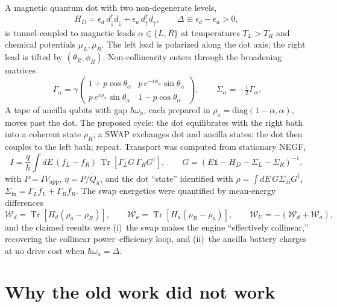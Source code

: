 \documentclass[11pt,a4paper]{article}
\newcommand{\up}{\uparrow}
\newcommand{\dn}{\downarrow}
\newcommand{\Tr}{\operatorname{Tr}}
\begin{document}
A magnetic quantum dot with two non-degenerate levels,
\begin{equation}
H_D=\epsilon_d\, d^\dagger_\dn d_\dn+\epsilon_u\, d^\dagger_\up d_\up,
\qquad \Delta\equiv\epsilon_d-\epsilon_u>0,
\end{equation}
is tunnel-coupled to magnetic leads $\alpha\in\{L,R\}$ at temperatures $T_L>T_R$ and chemical potentials $\mu_L,\mu_R$. The left lead is polarized along the dot axis; the right lead is tilted by $(\theta_R,\phi_R)$. Non-collinearity enters through the broadening matrices
\begin{equation}\label{eq:gamma}
\Gamma_\alpha=\gamma
\begin{pmatrix}
1+p\cos\theta_\alpha & p\,e^{-i\phi_\alpha}\sin\theta_\alpha\\
p\,e^{i\phi_\alpha}\sin\theta_\alpha & 1-p\cos\theta_\alpha
\end{pmatrix},
\qquad \Sigma_\alpha=-\tfrac{i}{2}\Gamma_\alpha .
\end{equation}
A tape of ancilla qubits with gap $\hbar\omega_a$, each prepared in $\rho_a=\mathrm{diag}(1-\alpha,\alpha)$, moves past the dot. The proposed cycle: the dot equilibrates with the right bath into a coherent state $\rho_R$; a SWAP exchanges dot and ancilla states; the dot then couples to the left bath; repeat. Transport was computed from stationary NEGF,
\begin{equation}\label{eq:landauer}
I=\frac{q}{h}\!\int\! dE\,(f_L-f_R)\,\Tr\!\left[\Gamma_L G\, \Gamma_R G^\dagger\right],
\qquad
G=(E\mathbb{1}-H_D-\Sigma_L-\Sigma_R)^{-1},
\end{equation}
with $P=IV_{\mathrm{app}}$, $\eta=P/\dot Q_h$, and the dot ``state'' identified with $\rho=\int dE\,G\Sigma_{\mathrm{in}}G^\dagger$, $\Sigma_{\mathrm{in}}=\Gamma_Lf_L+\Gamma_Rf_R$. The swap energetics were quantified by mean-energy differences
\begin{equation}\label{eq:Wd}
\mathcal{W}_d=\Tr\!\left[H_d(\rho_a-\rho_R)\right],\qquad
\mathcal{W}_a=\Tr\!\left[H_a(\rho_R-\rho_a)\right],\qquad
\mathcal{W}_U=-(\mathcal{W}_d+\mathcal{W}_a),
\end{equation}
and the claimed results were (i)~the swap makes the engine ``effectively collinear,'' recovering the collinear power--efficiency loop, and (ii)~the ancilla battery charges at no drive cost when $\hbar\omega_a=\Delta$.

\section{Why the old work did not work}\label{sec:wrong}
\end{document}

